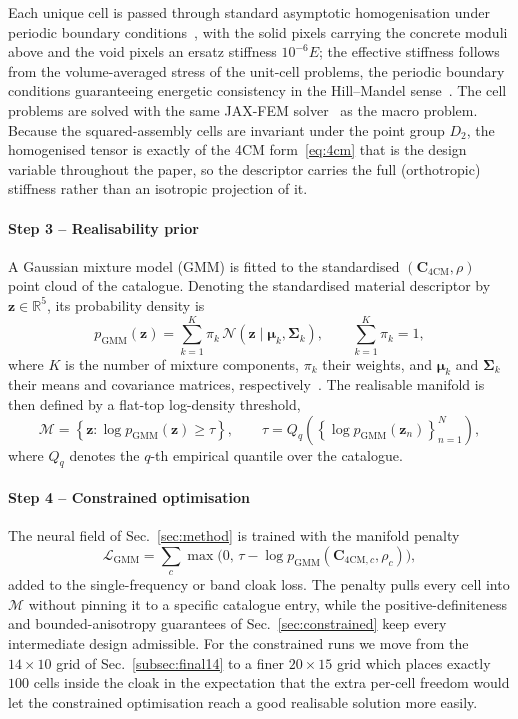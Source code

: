 \documentclass[preprint,12pt]{elsarticle}
\newcommand{\mbf}[1]{\mathbf{#1}}
\newcommand{\be}{\begin{equation}}
\newcommand{\ee}{\end{equation}}
\newcommand{\mcl}[1]{\mathcal{#1}}
\begin{document}
Each unique cell is passed through standard
asymptotic homogenisation under periodic boundary
conditions~\citep{bendsoe1988,hassani1998,andreassen2014}, with the solid pixels
carrying the concrete moduli above and the void pixels an ersatz stiffness
$10^{-6}E$; the effective stiffness follows from the volume-averaged stress of
the unit-cell problems, the periodic boundary conditions guaranteeing
energetic consistency in the Hill--Mandel sense~\citep{hill1963}. The cell
problems are solved with the same JAX-FEM solver~\citep{xu2020jaxfem} as the
macro problem. Because the squared-assembly cells are
invariant under the point group $D_2$, the homogenised tensor is exactly of the
4CM form~\eqref{eq:4cm} that is the design variable throughout the paper, so the descriptor carries the full (orthotropic) stiffness rather than an isotropic projection of it.

\paragraph{Step 3 -- Realisability prior}
A Gaussian mixture model (GMM) is fitted to the standardised
$(\mbf{C}_{\mathrm{4CM}},\rho)$ point cloud of the catalogue. Denoting the
standardised material descriptor by
$\mbf{z}\in\mathbb{R}^{5}$, its probability density is
\be\label{eq:gmm_density}
  p_{\mathrm{GMM}}(\mbf{z})
  =
  \sum_{k=1}^{K}\pi_k\,
  \mcl{N}\!\left(\mbf{z}\mid\boldsymbol{\mu}_k,\boldsymbol{\Sigma}_k\right),
  \qquad
  \sum_{k=1}^{K}\pi_k=1,
\ee
where $K$ is the number of mixture components, $\pi_k$ their weights, and
$\boldsymbol{\mu}_k$ and $\boldsymbol{\Sigma}_k$ their means and covariance
matrices, respectively~\citep{mclachlan2000}. The realisable manifold is then
defined by a flat-top log-density threshold,
\be\label{eq:gmm_manifold}
  \mcl{M}
  =
  \left\{\mbf{z}:\log p_{\mathrm{GMM}}(\mbf{z})\ge\tau\right\},
  \qquad
  \tau
  =
  Q_q\!\left(
    \left\{\log p_{\mathrm{GMM}}(\mbf{z}_n)\right\}_{n=1}^{N}
  \right),
\ee
where $Q_q$ denotes the $q$-th empirical quantile over the catalogue.

\paragraph{Step 4 -- Constrained optimisation} The neural field of
Sec.~\ref{sec:method} is trained with the manifold penalty
\be\label{eq:gmm_pen}
  \mcl{L}_{\mathrm{GMM}}
  = \sum_c \max\!\bigl(0,\,\tau-\log p_{\mathrm{GMM}}(\mbf{C}_{\mathrm{4CM},c},\rho_c)\bigr),
\ee
added to the single-frequency or band cloak loss. The penalty pulls every cell
into $\mcl{M}$ without pinning it to a specific catalogue entry, while the
positive-definiteness and bounded-anisotropy guarantees of
Sec.~\ref{sec:constrained} keep every intermediate design admissible. For the
constrained runs we move from the $14\times10$ grid of Sec.~\ref{subsec:final14}
to a finer $20\times15$ grid  which places exactly $100$ cells inside the
cloak in the expectation that the extra per-cell freedom would let the
constrained optimisation reach a good realisable solution more easily.
\end{document}
